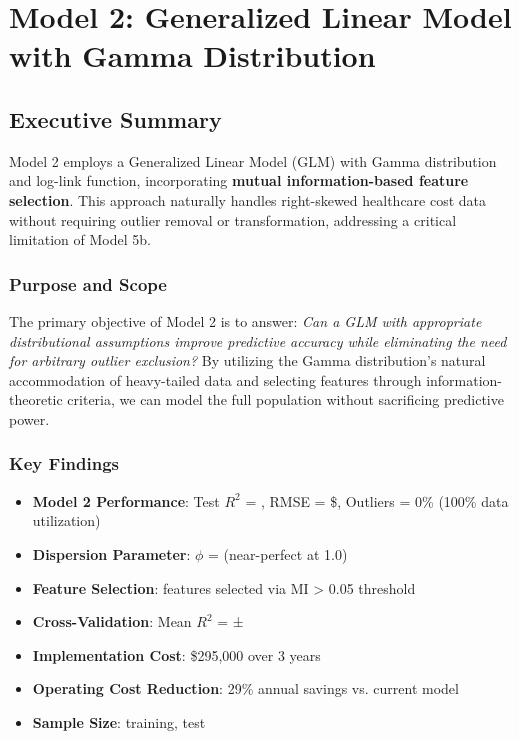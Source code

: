 \chapter{Model 2: Generalized Linear Model with Gamma Distribution}\label{ch:model2}


\def\themodel{2}

\section{Executive Summary}

Model 2 employs a Generalized Linear Model (GLM) with Gamma distribution and log-link function, incorporating \textbf{mutual information-based feature selection}. This approach naturally handles right-skewed healthcare cost data without requiring outlier removal or transformation, addressing a critical limitation of Model 5b.

\subsection{Purpose and Scope}

The primary objective of Model 2 is to answer: \textit{Can a GLM with appropriate distributional assumptions improve predictive accuracy while eliminating the need for arbitrary outlier exclusion?} By utilizing the Gamma distribution's natural accommodation of heavy-tailed data and selecting features through information-theoretic criteria, we can model the full population without sacrificing predictive power.

\subsection{Key Findings}

\begin{itemize}
    \item \textbf{Model 2 Performance}: Test $R^2$ = \ModelTwoRSquaredTest, RMSE = \$\ModelTwoRMSETest, Outliers = 0\% (100\% data utilization)
    \item \textbf{Dispersion Parameter}: $\phi$ = \ModelTwoDispersion{} (near-perfect at 1.0)
    \item \textbf{Feature Selection}: \ModelTwoNumFeatures{} features selected via MI > 0.05 threshold
    \item \textbf{Cross-Validation}: Mean $R^2$ = \ModelTwoCVMean{} ± \ModelTwoCVStd
    \item \textbf{Implementation Cost}: \$295,000 over 3 years
    \item \textbf{Operating Cost Reduction}: 29\% annual savings vs. current model
    \item \textbf{Sample Size}: \ModelTwoTrainingSamples{} training, \ModelTwoTestSamples{} test
\end{itemize}


